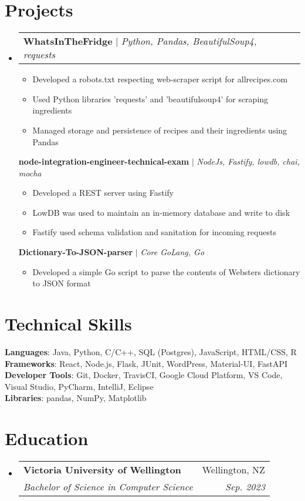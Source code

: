 \documentclass[letterpaper,11pt]{article}
\makeatletter
\newcommand{\resumeItem}[1]{
  \item\small{
    {#1 \vspace{-2pt}}
  }
}
\newcommand{\resumeSubheading}[4]{
  \vspace{-2pt}\item
    \begin{tabular*}{0.97\textwidth}[t]{l@{\extracolsep{\fill}}r}
      \textbf{#1} & #2 \\
      \textit{\small#3} & \textit{\small #4} \\
    \end{tabular*}\vspace{-7pt}
}
\newcommand{\resumeProjectHeading}[2]{
    \item
    \begin{tabular*}{0.97\textwidth}{l@{\extracolsep{\fill}}r}
      \small#1 & #2 \\
    \end{tabular*}\vspace{-7pt}
}
\newcommand{\resumeSubHeadingListStart}{\begin{itemize}[leftmargin=0.15in, label={}]}
\newcommand{\resumeSubHeadingListEnd}{\end{itemize}}
\newcommand{\resumeItemListStart}{\begin{itemize}\vspace{0pt}}
\newcommand{\resumeItemListEnd}{\end{itemize}\vspace{0pt}}
\makeatother
\begin{document}
\section{Projects}
    \resumeSubHeadingListStart
      \resumeProjectHeading
        {\textbf{WhatsInTheFridge{\vspace{5pt}}} $|$ \emph{Python, Pandas, BeautifulSoup4, requests}}{}
          \resumeItemListStart
            \resumeItem{Developed a robots.txt respecting web-scraper script for allrecipes.com}
            \resumeItem{Used Python libraries 'requests' and 'beautifulsoup4' for scraping ingredients}
            \resumeItem{Managed storage and persistence of recipes and their ingredients using Pandas}
          \resumeItemListEnd
        {\textbf{node-integration-engineer-technical-exam} $|$ \emph{NodeJs, Fastify, lowdb, chai, mocha}}{}
          \resumeItemListStart
            \resumeItem{Developed a REST server using Fastify}
            \resumeItem{LowDB was used to maintain an in-memory database and write to disk}
            \resumeItem{Fastify used schema validation and sanitation for incoming requests}
          \resumeItemListEnd
        {\textbf{Dictionary-To-JSON-parser} $|$ \emph{Core GoLang, Go}}{}
          \resumeItemListStart
            \resumeItem{Developed a simple Go script to parse the contents of Websters dictionary to JSON format}
          \resumeItemListEnd
    \resumeSubHeadingListEnd



%
\section{Technical Skills}
 \begin{itemize}[leftmargin=0.15in, label={}]
    \small{\item{
     \textbf{Languages}{: Java, Python, C/C++, SQL (Postgres), JavaScript, HTML/CSS, R} \\
     \textbf{Frameworks}{: React, Node.js, Flask, JUnit, WordPress, Material-UI, FastAPI} \\
     \textbf{Developer Tools}{: Git, Docker, TravisCI, Google Cloud Platform, VS Code, Visual Studio, PyCharm, IntelliJ, Eclipse} \\
     \textbf{Libraries}{: pandas, NumPy, Matplotlib}
    }}
 \end{itemize}


\section{Education}
  \resumeSubHeadingListStart
    \resumeSubheading
      {Victoria University of Wellington}{Wellington, NZ}
      {Bachelor of Science in Computer Science}{Sep. 2023}
      
  \resumeSubHeadingListEnd

\end{document}
